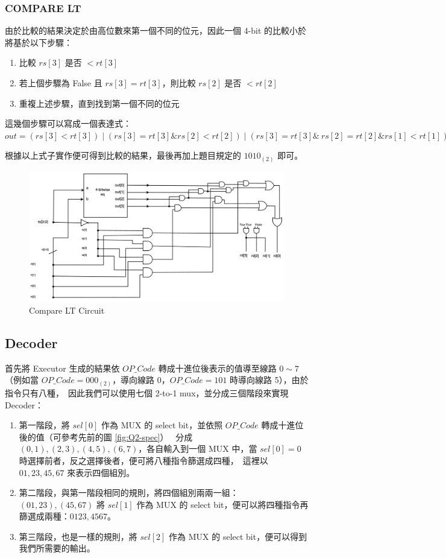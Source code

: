 \documentclass[10.5pt,compsoc,UTF8]{CjC}
\theoremstyle{mystyle}
\begin{document}
\newpage

\subsubsection*{COMPARE LT}
由於比較的結果決定於由高位數來第一個不同的位元，因此一個 4-bit 的比較小於將基於以下步驟：
\begin{enumerate}
  \item 比較 $rs[3]$ 是否 $< rt[3]$
  \item 若上個步驟為 False 且 $rs[3] = rt[3]$，則比較 $rs[2]$ 是否 $< rt[2]$
  \item 重複上述步驟，直到找到第一個不同的位元
\end{enumerate}

這幾個步驟可以寫成一個表達式：
$out = (rs[3] < rt[3]) \mid (rs[3] = rt[3] \& rs[2] < rt[2]) \mid (rs[3] = rt[3] \& \
rs[2] = rt[2] \& rs[1] < rt[1]) \mid (rs[3] = rt[3] \& rs[2] = rt[2] \& rs[1] = rt[1] \& rs[0] < rt[0])$

根據以上式子實作便可得到比較的結果，最後再加上題目規定的 $1010_{(2)}$ 即可。

\begin{figure}[htp]
  \centering
  \includegraphics[width=\textwidth]{LT.png}
  \caption{Compare LT Circuit}
  \label{fig:LT}
\end{figure}

\subsection{Decoder}
首先將 Executor 生成的結果依 $OP\_Code$ 轉成十進位後表示的值導至線路 $0 \sim 7$（例如當 $OP\_Code = 000_{(2)}$，導向線路 0，$OP\_Code = 101$ 時導向線路 5），由於指令只有八種，\
因此我們可以使用七個 2-to-1 mux，並分成三個階段來實現 Decoder：

\begin{enumerate}
  \item 第一階段，將 $sel[0]$ 作為 MUX 的 select bit，並依照 $OP\_Code$ 轉成十進位後的值（可參考先前的圖 \ref{fig:Q2-spec}） \
  分成 $(0, 1), (2, 3), (4, 5), (6, 7)$，各自輸入到一個 MUX 中，當 $sel[0] = 0$ 時選擇前者，反之選擇後者，便可將八種指令篩選成四種，\
  這裡以 $01, 23, 45, 67$ 來表示四個組別。
  \item 第二階段，與第一階段相同的規則，將四個組別兩兩一組：$(01, 23), (45, 67)$ 將 $sel[1]$ 作為 MUX 的 select bit，便可以將四種指令再篩選成兩種：$0123, 4567$。
  \item 第三階段，也是一樣的規則，將 $sel[2]$ 作為 MUX 的 select bit，便可以得到我們所需要的輸出。
\end{enumerate}
\end{document}

